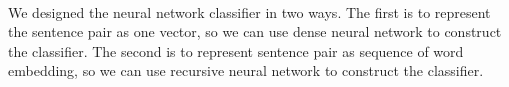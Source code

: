 \documentclass[12pt]{article}
\begin{document}
\begin{CJK*}{UTF8}{bkai}
\begin{spacing}{1.77}
\paragraph{}
We designed the neural network classifier in two ways. The first is to represent the sentence pair as one vector, so we can use dense neural network to construct the classifier. The second is to represent sentence pair as sequence of word embedding, so we can use recursive neural network to construct the classifier.




\end{spacing}
\end{CJK*}
\end{document}
